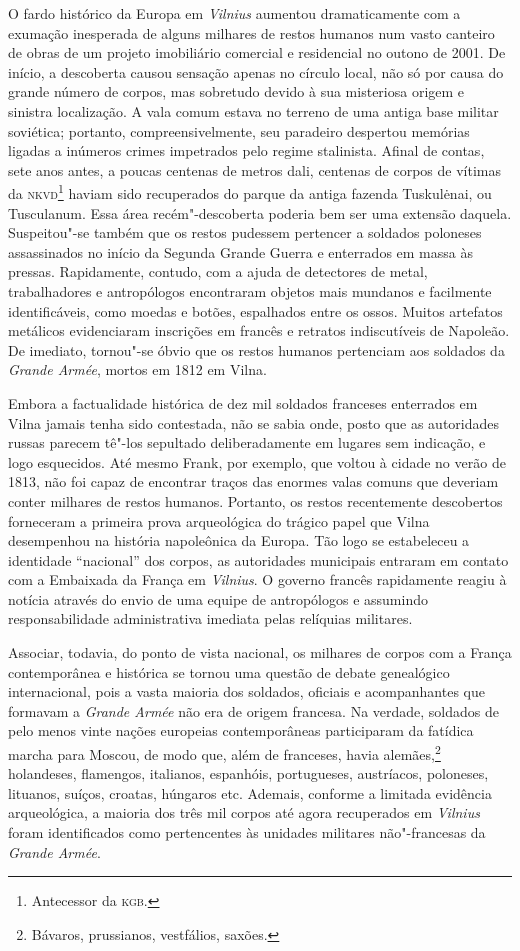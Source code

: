 O fardo histórico da Europa em \textit{Vilnius} aumentou dramaticamente com a
exumação inesperada de alguns milhares de restos humanos num vasto
canteiro de obras de um projeto imobiliário comercial e residencial no
outono de 2001. De início, a descoberta causou sensação apenas no
círculo local, não só por causa do grande número de corpos, mas
sobretudo devido à sua misteriosa origem e sinistra localização. A vala
comum estava no terreno de uma antiga base militar soviética; portanto,
compreensivelmente, seu paradeiro despertou memórias ligadas a inúmeros
crimes impetrados pelo regime stalinista. Afinal de contas, sete anos
antes, a poucas centenas de metros dali, centenas de corpos de vítimas
da \textsc{nkvd}\footnote{Antecessor da \textsc{kgb}.} haviam sido recuperados do parque da antiga fazenda
Tuskulėnai, ou Tusculanum. Essa área recém"-descoberta poderia bem ser uma
extensão daquela. Suspeitou"-se também que os restos pudessem pertencer a
soldados poloneses assassinados no início da Segunda Grande Guerra e
enterrados em massa às pressas. Rapidamente, contudo, com a ajuda de
detectores de metal, trabalhadores e antropólogos encontraram objetos
mais mundanos e facilmente identificáveis, como moedas e botões,
espalhados entre os ossos. Muitos artefatos metálicos evidenciaram
inscrições em francês e retratos indiscutíveis de Napoleão. De imediato,
tornou"-se óbvio que os restos humanos pertenciam aos soldados da
\textit{Grande Armée}, mortos em 1812 em Vilna.

Embora a factualidade histórica de dez mil soldados franceses enterrados
em Vilna jamais tenha sido contestada, não se sabia onde, posto que as
autoridades russas parecem tê"-los sepultado deliberadamente em lugares
sem indicação, e logo esquecidos. Até mesmo Frank, por exemplo, que
voltou à cidade no verão de 1813, não foi capaz de encontrar traços das
enormes valas comuns que deveriam conter milhares de restos humanos.
Portanto, os restos recentemente descobertos forneceram a primeira prova
arqueológica do trágico papel que Vilna desempenhou na história
napoleônica da Europa. Tão logo se estabeleceu a identidade ``nacional''
dos corpos, as autoridades municipais entraram em contato com a
Embaixada da França em \textit{Vilnius}. O governo francês rapidamente reagiu à
notícia através do envio de uma equipe de antropólogos e assumindo
responsabilidade administrativa imediata pelas relíquias militares.

Associar, todavia, do ponto de vista nacional, os milhares de corpos com
a França contemporânea e histórica se tornou uma questão de debate
genealógico internacional, pois a vasta maioria dos soldados, oficiais e
acompanhantes que formavam a \textit{Grande Armée} não era de origem
francesa. Na verdade, soldados de pelo menos vinte nações europeias
contemporâneas participaram da fatídica marcha para Moscou, de modo que,
além de franceses, havia alemães,\footnote{Bávaros, prussianos, vestfálios,
saxões.} holandeses, flamengos, italianos, espanhóis, portugueses,
austríacos, poloneses, lituanos, suíços, croatas, húngaros etc. Ademais,
conforme a limitada evidência arqueológica, a maioria dos três mil
corpos até agora recuperados em \textit{Vilnius} foram identificados como
pertencentes às unidades militares não"-francesas da \textit{Grande Armée}.

